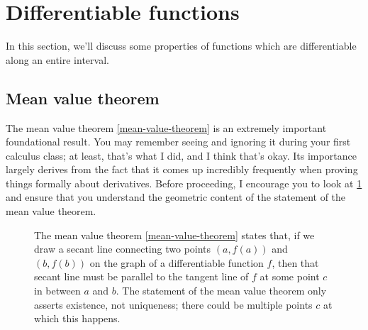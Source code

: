 \section{Differentiable functions}

In this section, we'll discuss some properties of functions which are differentiable along an entire interval.

\subsection{Mean value theorem}

The mean value theorem \ref{mean-value-theorem} is an extremely important foundational result. You may remember seeing and ignoring it during your first calculus class; at least, that's what I did, and I think that's okay. Its importance largely derives from the fact that it comes up incredibly frequently when proving things formally about derivatives. Before proceeding, I encourage you to look at \cref{mean-value-theorem-picture} and ensure that you understand the geometric content of the statement of the mean value theorem. 

\begin{figure}
	\begin{center}
	\end{center}

	\caption{The mean value theorem \ref{mean-value-theorem} states that, if we draw a secant line connecting two points $(a,f(a))$ and $(b,f(b))$ on the graph of a differentiable function $f$, then that secant line must be parallel to the tangent line of $f$ at some point $c$ in between $a$ and $b$. The statement of the mean value theorem only asserts existence, not uniqueness; there could be multiple points $c$ at which this happens.} \label{mean-value-theorem-picture} 
\end{figure}

